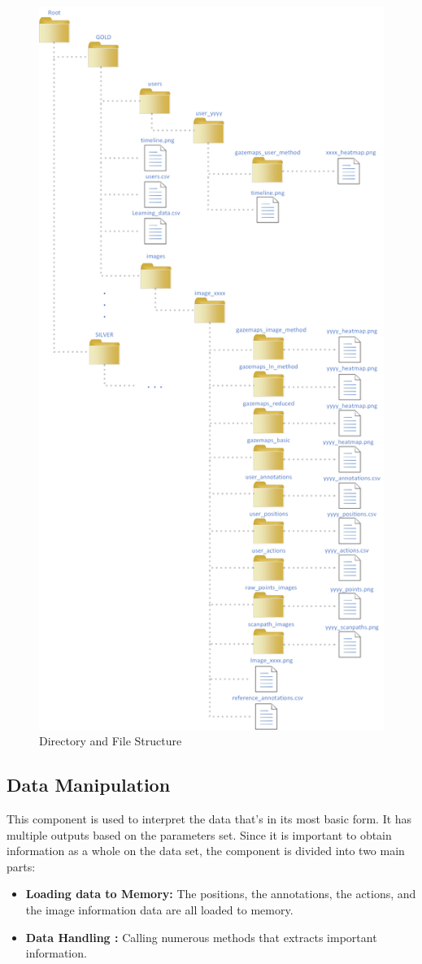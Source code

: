 \documentclass[a4paper,11pt]{report}
\numberwithin{figure}{section} %
\begin{document}
       \begin{figure}[H]
        \centering
         \includegraphics[width=.6\linewidth]{diagrams/directories.png}
         \caption{Directory and File Structure}
         \label{fig:struct}
       \end{figure}

	\subsection{Data Manipulation}

    This component is used to interpret the data that's in its most basic form.
    It has multiple outputs based on the parameters set.
    Since it is important to obtain information as a whole on the data set, the component is divided into two main parts:
    \begin{itemize}
        \item[\textbullet] \textbf{Loading data to Memory:} The positions, the annotations, the actions, and the image information data are all loaded to memory.
        \item[\textbullet] \textbf{Data Handling :} Calling numerous methods that extracts important information.
    \end{itemize}
\end{document}
